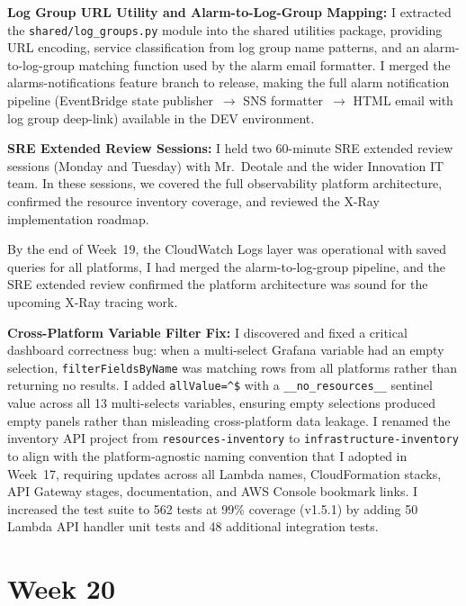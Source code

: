 \textbf{Log Group URL Utility and Alarm-to-Log-Group Mapping:} 
I extracted the
\texttt{shared/log\_groups.py} module into the shared
utilities package, providing URL encoding, service classification from
log group name patterns, and an alarm-to-log-group matching function
used by the alarm email formatter. I merged the alarms-notifications feature branch
to release, making the full alarm notification pipeline
(EventBridge state publisher~$\to$ SNS formatter~$\to$ HTML email with
log group deep-link) available in the DEV environment.

\textbf{SRE Extended Review Sessions:} 
I held two 60-minute SRE extended review
sessions (Monday and Tuesday) with Mr.\ Deotale and the wider Innovation
IT team. In these sessions, we covered the full observability platform architecture,
confirmed the resource inventory coverage, and reviewed the X-Ray
implementation roadmap.

By the end of Week~19, the CloudWatch Logs layer was operational with saved
queries for all platforms, I had merged the alarm-to-log-group pipeline,
and the SRE extended review confirmed the platform architecture was
sound for the upcoming X-Ray tracing work.

\textbf{Cross-Platform Variable Filter Fix:} 
I discovered and fixed a critical dashboard correctness
bug: when a multi-select Grafana variable had an
empty selection, \texttt{filterFieldsByName} was matching rows from all
platforms rather than returning no results. I added
\texttt{allValue=\^{}\$} with a \texttt{\_\_no\_resources\_\_} sentinel
value across all 13 multi-selects variables, ensuring empty selections
produced empty panels rather than misleading cross-platform data leakage.
I renamed the inventory API project from \texttt{resources-inventory} to
\texttt{infrastructure-inventory} to align with the platform-agnostic naming
convention that I adopted in Week~17, requiring updates across all Lambda names,
CloudFormation stacks, API Gateway stages, documentation, and AWS Console
bookmark links. I increased the test suite to 562 tests at 99\% coverage (v1.5.1)
by adding 50 Lambda API handler unit tests and 48 additional integration
tests.


\FloatBarrier

\section{Week 20}
\label{sec:week20}

